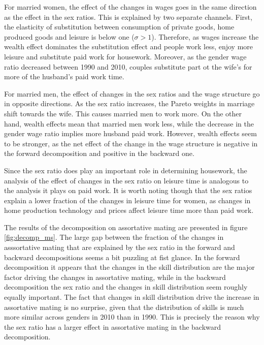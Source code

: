 \documentclass[12pt]{article}
\begin{document}
For married women, the effect of the changes in wages goes in the same direction as the effect in the sex ratios. This is explained by two separate channels. First, the elasticity of substitution between consumption of private goods, home produced goods and leisure is below one ($\sigma>1$). Therefore, as wages increase the wealth effect dominates the substitution effect and people work less, enjoy more leisure and substitute paid work for housework. Moreover, as the gender wage ratio decreased between 1990 and 2010, couples substitute part ot the wife's for more of the husband's paid work time.    

For married men, the effect of changes in the sex ratios and the wage structure go in opposite directions. As the sex ratio increases, the Pareto weights in marriage shift towards the wife. This causes married men to work more. On the other hand, wealth effects mean that married men work less, while the decrease in the gender wage ratio implies more husband paid work. However, wealth effects seem to be stronger, as the net effect of the change in the wage structure is negative in the forward decomposition and positive in the backward one.

Since the sex ratio does play an important role in determining housework, the analysis of the effect of changes in the sex ratio on leisure time is analogous to the analysis it plays on paid work. It is worth noting though that the sex ratios explain a lower fraction of the changes in leisure time for women, as changes in home production technology and prices affect leisure time more than paid work. 

The results of the decomposition on assortative mating are presented in figure \ref{fig:decomp_ms}. The large gap between the fraction of the changes in asssortative mating that are explained by the sex ratio in the forward and backward decompositions seems a bit puzzling at fist glance. In the forward decomposition it appears that the changes in the skill distribution are the major factor driving the changes in assortative mating, while in the backward decomposition the sex ratio and the changes in skill distribution seem roughly equally important. The fact that changes in skill distribution drive the increase in assortative mating is no surprise, given that the distribution of skills is much more similar across genders in 2010 than in 1990. This is precisely the reason why the sex ratio has a larger effect in assortative mating in the backward decomposition. 
\end{document}
